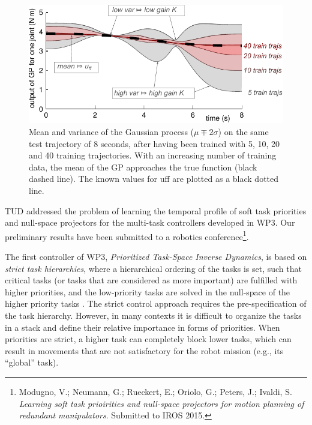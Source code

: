\begin{figure}
  \centering
  \includegraphics[width=\linewidth]{images/meanvariance.pdf}
  \caption{Mean and variance of the Gaussian process ($\mu \mp 2\sigma$) on
    the same test trajectory of 8 seconds, after having been trained with 5,
    10, 20 and 40 training trajectories. With an increasing number of training
    data, the mean of the GP approaches the true function (black dashed
    line). The known values for uff are plotted as a black dotted line.}
  \label{fig:meanvariance}
\end{figure}



TUD addressed the problem of learning the temporal profile of soft
task priorities and null-space projectors for the multi-task controllers
developed in WP3. Our preliminary results have been submitted to a robotics
conference\footnote{Modugno, V.; Neumann, G.; Rueckert, E.; Oriolo, G.; Peters,
J.; Ivaldi, S. \textit{Learning soft task prioirities and null-space projectors
for motion planning of redundant manipulators}. Submitted to IROS 2015.}.

The first controller of WP3, \textit{Prioritized Task-Space Inverse Dynamics},
is based on \textit{strict task hierarchies}, where a hierarchical ordering of
the tasks is set, such that critical tasks (or tasks that are considered as more
important) are fulfilled with higher priorities, and the low-priority tasks are
solved in the null-space of the higher priority tasks
\cite{DelPrete-2014-ID267}. The strict control approach requires the
pre-specification of the task hierarchy. However, in many contexts it is
difficult to organize the tasks in a stack and define their relative importance
in forms of priorities. When priorities are strict, a higher task can completely
block lower tasks, which can result in movements that are not satisfactory for
the robot mission (e.g., its ``global'' task). 

